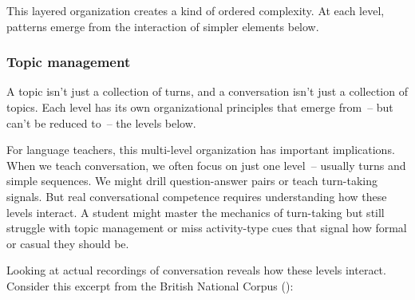This layered organization creates a kind of ordered complexity. At each level, patterns emerge from the interaction of simpler elements below. 

\subsubsection{Topic management}\label{sssec:topic-man}

A topic isn't just a collection of turns, and a conversation isn't just a collection of topics. Each level has its own organizational principles that emerge from~-- but can't be reduced to~-- the levels below.

For language teachers, this multi-level organization has important implications. When we teach conversation, we often focus on just one level~-- usually turns and simple sequences. We might drill question-answer pairs or teach turn-taking signals. But real conversational competence requires understanding how these levels interact. A student might master the mechanics of turn-taking but still struggle with topic management or miss activity-type cues that signal how formal or casual they should be.

Looking at actual recordings of conversation reveals how these levels interact. Consider this excerpt from the British National Corpus (\citeyear{BNC_KC8}):

